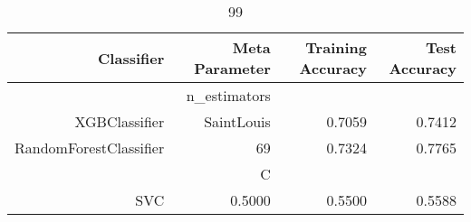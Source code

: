 
\begin{table}[H]
    \caption{99}
    \centering
    \begin{tabular}{|r|r|r|r|}
        \hline
        Classifier &Meta Parameter &Training Accuracy
        &Test Accuracy\\
        \hline
        &n\_estimators &\multicolumn{2}{|r|}{}\\
        \hline
        XGBClassifier &SaintLouis &0.7059 &0.7412\\
        \hline
        RandomForestClassifier &69 &0.7324 &0.7765\\
        \hline
        &C &\multicolumn{2}{|r|}{}\\
        \hline
        SVC &0.5000 &0.5500 &0.5588\\
        \hline
    \end{tabular}
\end{table}
